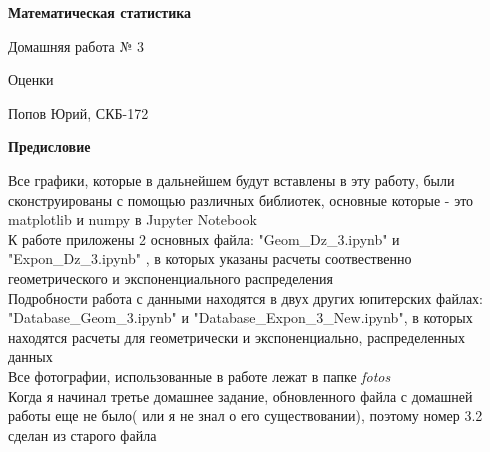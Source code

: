 \documentclass[a4paper,12pt, oneside]{book}
\begin{document}
	\pagestyle{plain}
	
	\begin{titlepage}	
		\begin{center}
			{\Huge \textbf{Математическая статистика}}
			\vspace{30mm}
			
			{\Huge Домашняя работа № 3 \\}
			\vspace{30mm}
			
			{\huge Оценки}
			\vspace{30mm}
			
			{\Large Попов Юрий, СКБ-172}
		\end{center}
	\end{titlepage}
	
	
	
\begin{spacing}{0.99}          
	\tableofcontents %
\end{spacing}

\newpage
\begin{center}
	{\Huge{\bf{Предисловие}}}
\end{center}




Все графики, которые в дальнейшем будут вставлены в эту работу, были сконструированы с помощью различных библиотек, основные которые - это matplotlib  и numpy в Jupyter Notebook\\

К работе приложены 2 основных файла: "Geom\_Dz\_3.ipynb" и "Expon\_Dz\_3.ipynb" , в которых указаны расчеты  соотвественно геометрического и  экспоненциального распределения\\

Подробности работа с данными находятся в двух других юпитерских файлах: "Database\_Geom\_3.ipynb" и "Database\_Expon\_3\_New.ipynb", в которых находятся расчеты для геометрически и экспоненциально, распределенных данных\\

Все фотографии, использованные в работе лежат в папке {\it fotos}\\

Когда я начинал третье домашнее задание, обновленного файла с домашней работы еще не было( или я не знал о его существовании), поэтому номер 3.2 сделан из старого файла\\
\end{document}
